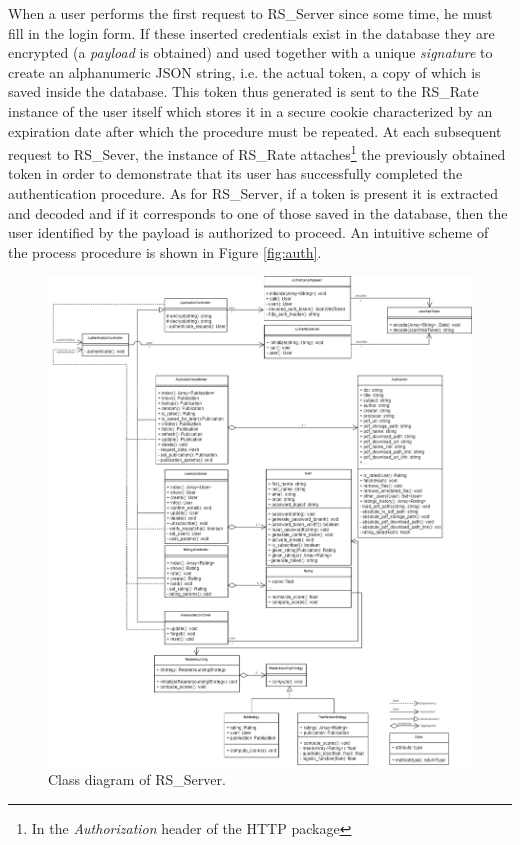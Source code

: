 \documentclass[a4paper, english]{article}
\begin{document}
When a user performs the first request to RS\_Server since some time, he must fill in the login form. If these inserted credentials exist in the database they are encrypted (a \emph{payload} is obtained) and used together with a unique \emph{signature} to create an alphanumeric JSON string, i.e. the actual token, a copy of which is saved inside the database. This token thus generated is sent to the RS\_Rate instance of the user itself which stores it in a secure cookie characterized by an expiration date after which the procedure must be repeated. At each subsequent request to RS\_Sever, the instance of RS\_Rate attaches\footnote{In the \emph{Authorization} header of the HTTP package} the previously obtained token in order to demonstrate that its user has successfully completed the authentication procedure. As for RS\_Server, if a token is present it is extracted and decoded and if it corresponds to one of those saved in the database, then the user identified by the payload is authorized to proceed. An intuitive scheme of the process procedure is shown in Figure \ref{fig:auth}.

\begin{figure}[!tbp]
\centering
\includegraphics[scale=0.4]{figures/classi-1.png}
\caption{Class diagram of RS\_Server.}
\label{fig:class-1}
\end{figure}
\end{document}
